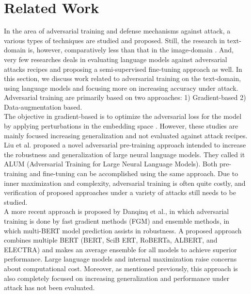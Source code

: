 \documentclass[%
	BCOR=8mm, %
	DIV=12,
	toc=bibliography, %
	toc=listof, %
	oneside, %
	egregdoesnotlikesansseriftitles, %
	]{scrbook}
\begin{document}
\chapter{Related Work}
\label{chapter:relatedwork}
In the area of adversarial training and defense mechanisms against attack, a various types of techniques are studied and proposed. Still, the research in text-domain is, however, comparatively less than that in the image-domain \cite{wang_towards_2021}. And, very few researches deals in evaluating language models against adversarial attacks recipes and proposing a semi-supervised fine-tuning approach as well. In this section, we discuss work related to adversarial training on the text-domain, using language models and focusing more on increasing accuracy under attack.
Adversarial training are primarily based on two approaches: 1) Gradient-based 2) Data-augmentation based. \\
The objective in gradient-based  is to optimize the adversarial loss for the model by applying perturbations in the embedding space \cite{liu_adversarial_2020,goodfellow_explaining_2015,zhu_at-bert_2021,miyato_adversarial_2017,jiang_smart_2020-1} .  However, these studies are mainly focused increasing generalization and not evaluated against attack recipes.\\
 Liu et al.\cite{liu_adversarial_2020} proposed a novel adversarial pre-training approach intended to increase the robustness and generalization of large neural language models. They called it ALUM (Adversarial Training for Large Neural Language Models). Both pre-training and fine-tuning can be accomplished using the same approach. Due to inner maximization and complexity, adversarial training is often quite costly, and verification of proposed approaches under a variety of attacks still needs to be studied.\\
A more recent approach is proposed by Danqinq et al.\cite{zhu_at-bert_2021}, in which adversarial training is done by fast gradient methods (FGM) \cite{miyato_adversarial_2017} and ensemble methods, in which multi-BERT model prediction assists in robustness. A proposed approach combines multiple BERT (BERT, SciB ERT, RoBERTa, ALBERT, and ELECTRA) and makes an average ensemble for all models to achieve superior performance. Large language models and internal maximization raise concerns about computational cost. Moreover, as mentioned previously, this approach is also completely focused on increasing generalization and performance under attack has not been evaluated.\\
\end{document}
